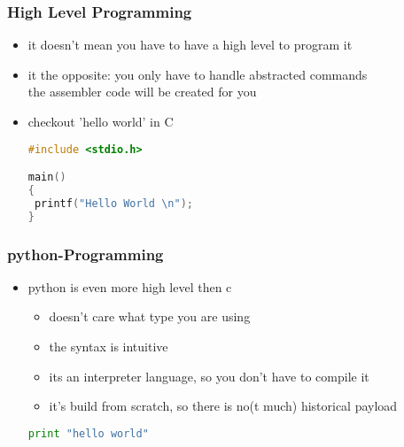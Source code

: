 \documentclass[hyperref={pdfpagelabels=false}]{beamer}
\begin{document}
		\begin{frame}[fragile]
			\frametitle{High Level Programming}
			\begin{itemize}
            	\item<1-> it doesn't mean you have to have a high level to program it
                \item<2-> it the opposite: you only have to handle abstracted commands \\
                          the assembler code will be created for you
                \item<3-> checkout 'hello world' in C
                \begin{lstlisting}[language=c]
#include <stdio.h>

main()
{
 printf("Hello World \n");
}
\end{lstlisting}
            \end{itemize}
		\end{frame}
		\begin{frame}[fragile]
			\frametitle{python-Programming}
			\begin{itemize}
            	\item<1-> python is even more high level then c
                \begin{itemize}
                    \item<2-> doesn't care what type you are using
                    \item<3-> the syntax is intuitive
                    \item<4-> its an interpreter language, so you don't have to compile it
                    \item<4-> it's build from scratch, so there is no(t much) historical payload
                \end{itemize}
                \begin{lstlisting}[language=python]
print "hello world"
\end{lstlisting}
            \end{itemize}
		\end{frame}
\end{document}
